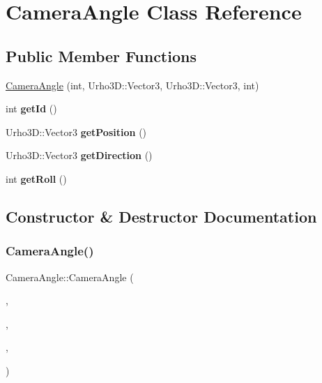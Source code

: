 \hypertarget{class_camera_angle}{}\section{Camera\+Angle Class Reference}
\label{class_camera_angle}
\subsection*{Public Member Functions}
\begin{DoxyCompactItemize}
\item 
\mbox{\hyperlink{class_camera_angle_a9d35397d67ac2aae78b7d88edabeb29e}{Camera\+Angle}} (int, Urho3\+D\+::\+Vector3, Urho3\+D\+::\+Vector3, int)
\item 
\mbox{\label{class_camera_angle_abb2b09676498740c02550c815ca3fc55}} 
int {\bfseries get\+Id} ()
\item 
\mbox{\label{class_camera_angle_a98121dba7afa1fe08f4015e1daaad35d}} 
Urho3\+D\+::\+Vector3 {\bfseries get\+Position} ()
\item 
\mbox{\label{class_camera_angle_aefce24a4d7e8ddc6ad58a5aaeb9b853c}} 
Urho3\+D\+::\+Vector3 {\bfseries get\+Direction} ()
\item 
\mbox{\label{class_camera_angle_a39077cb1b780dc482d620eaa05e4b3bf}} 
int {\bfseries get\+Roll} ()
\end{DoxyCompactItemize}


\subsection{Constructor \& Destructor Documentation}
\mbox{\label{class_camera_angle_a9d35397d67ac2aae78b7d88edabeb29e}} 
\subsubsection{\texorpdfstring{CameraAngle()}{CameraAngle()}}
{\footnotesize\ttfamily Camera\+Angle\+::\+Camera\+Angle (\begin{DoxyParamCaption}\item[{int}]{,  }\item[{Urho3\+D\+::\+Vector3}]{,  }\item[{Urho3\+D\+::\+Vector3}]{,  }\item[{int}]{ }\end{DoxyParamCaption})}

